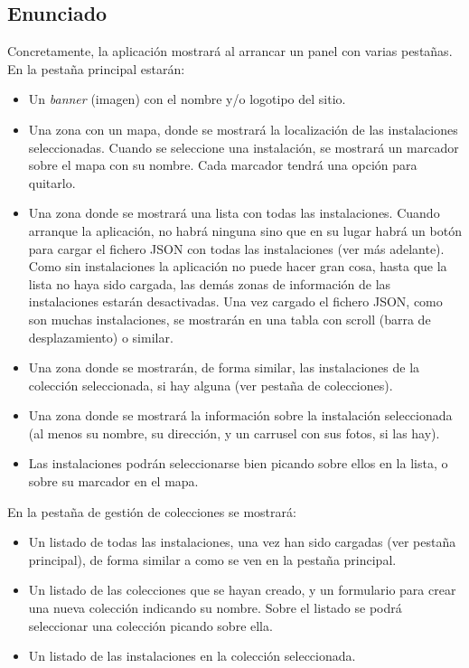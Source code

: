 \subsection{Enunciado}

Concretamente, la aplicación mostrará al arrancar un panel con varias pestañas. En la pestaña principal estarán:

\begin{itemize}
  \item Un \emph{banner} (imagen) con el nombre y/o logotipo del sitio.
  \item Una zona con un mapa, donde se mostrará la localización de las instalaciones seleccionadas. Cuando se seleccione una instalación, se mostrará un marcador sobre el mapa con su nombre. Cada marcador tendrá una opción para quitarlo.
  \item Una zona donde se mostrará una lista con todas las instalaciones. Cuando arranque la aplicación, no habrá ninguna sino que en su lugar habrá un botón para cargar el fichero JSON con todas las instalaciones (ver más adelante). Como sin instalaciones la aplicación no puede hacer gran cosa, hasta que la lista no haya sido cargada, las demás zonas de información de las instalaciones estarán desactivadas. Una vez cargado el fichero JSON, como son muchas instalaciones, se mostrarán en una tabla con scroll (barra de desplazamiento) o similar.
  \item Una zona donde se mostrarán, de forma similar, las instalaciones de la colección seleccionada, si hay alguna (ver pestaña de colecciones).
  \item Una zona donde se mostrará la información sobre la instalación seleccionada (al menos su nombre, su dirección, y un carrusel con sus fotos, si las hay).
  \item Las instalaciones podrán seleccionarse bien picando sobre ellos en la lista, o sobre su marcador en el mapa.
\end{itemize}

En la pestaña de gestión de colecciones se mostrará:

\begin{itemize}
  \item Un listado de todas las instalaciones, una vez han sido cargadas (ver pestaña principal), de forma similar a como se ven en la pestaña principal.
  \item Un listado de las colecciones que se hayan creado, y un formulario para crear una nueva colección indicando su nombre. Sobre el listado se podrá seleccionar una colección picando sobre ella.
  \item Un listado de las instalaciones en la colección seleccionada.
\end{itemize}

